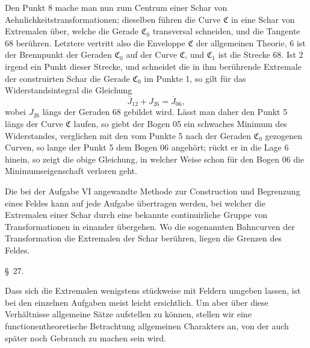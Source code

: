 \documentclass[11pt,a4paper,leqno]{article}
\begin{document}
Den Punkt 8 mache man nun zum Centrum einer Schar von Aehnlichkeitstransformationen; dieselben führen die Curve $\mathfrak{C}$
in eine Schar von Extremalen über, welche die Gerade $\mathfrak{C}_0$ transversal schneiden, und die Tangente 68 berühren. Letztere vertritt also die Enveloppe $\mathfrak{C}$ der allgemeinen Theorie, 6 ist der Brennpunkt der Geraden $\mathfrak{C}_0$ auf der Curve $\mathfrak{C}$, und $\mathfrak{C}_1$ ist die Strecke 68. Ist 2 irgend ein Punkt dieser Strecke, und schneidet die in ihm berührende Extremale der construirten Schar die Gerade $\mathfrak{C}_0$ im Punkte 1, so gilt für das Widerstandsintegral die Gleichung
\[
\overline{J}_{12}+J_{26}=\overline{J}_{06},
\]
wobei $J_{26}$ längs der Geraden 68 gebildet wird. Lässt man daher den Punkt 5 längs der Curve $\mathfrak{C}$ laufen, so giebt der Bogen 05 ein schwaches Minimum des Widerstandes, verglichen mit den vom Punkte 5 nach der Geraden $\mathfrak{C}_0$ gezogenen Curven, so lange der Punkt 5 dem Bogen 06 angehört; rückt er in die Lage 6 hinein, so zeigt die obige Gleichung, in welcher Weise schon für den Bogen 06 die Minimumseigenschaft verloren geht.

Die bei der Aufgabe VI angewandte Methode zur Construction und Begrenzung eines Feldes kann auf jede Aufgabe übertragen werden, bei welcher die Extremalen einer Schar durch eine bekannte continuirliche Gruppe von Transformationen in einander übergehen. Wo die sogenannten Bahncurven der Transformation die Extremalen der Schar berühren, liegen die Grenzen des Feldes.


\begin{center}{\large \S~27.}\end{center}

Dass sich die Extremalen wenigstens stückweise mit Feldern umgeben lassen, ist bei den einzelnen Aufgaben meist leicht ersichtlich. Um aber über diese Verhältnisse allgemeine Sätze aufstellen zu können, stellen wir eine functionentheoretische Betrachtung allgemeinen Charakters an, von der auch später noch Gebrauch zu machen sein wird.
\end{document}
